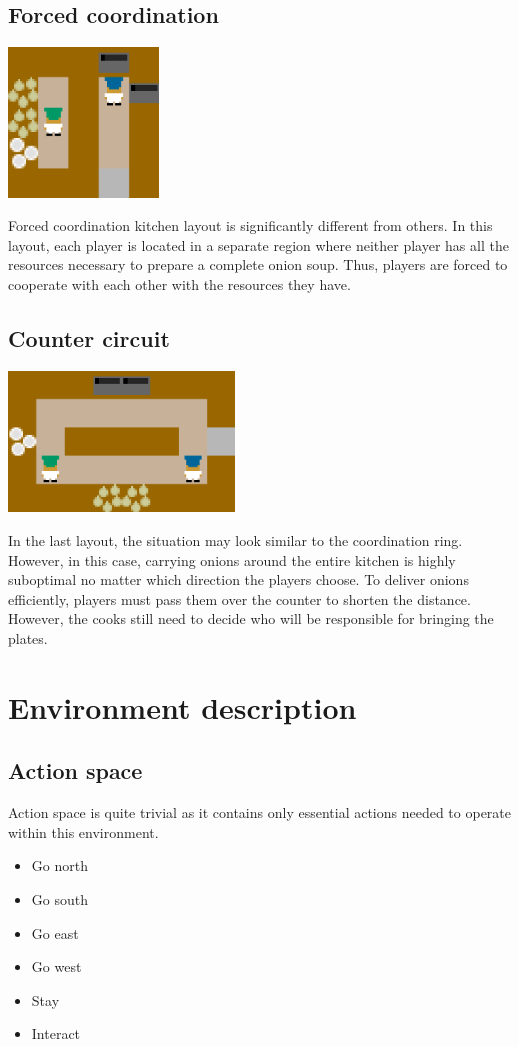 \subsection*{Forced coordination}
\begin{center}
    \includegraphics*[width=4cm]{../img/forced_coordination_layout.png}
\end{center}
Forced coordination kitchen layout is significantly different from others. 
In this layout, each player is located in a separate region where neither player has all the resources necessary to prepare a complete onion soup. 
Thus, players are forced to cooperate with each other with the resources they have.

\subsection*{Counter circuit}
\begin{center}
    \includegraphics*[width=6cm]{../img/counter_circuit_layout.png}
\end{center}
In the last layout, the situation may look similar to the coordination ring. However, in this case, carrying onions around the entire kitchen is highly suboptimal no matter which direction the players choose. 
To deliver onions efficiently, players must pass them over the counter to shorten the distance. 
However, the cooks still need to decide who will be responsible for bringing the plates. 


\section{Environment description}
\subsection{Action space}
Action space is quite trivial as it contains only essential actions needed to operate within this environment.
\begin{itemize}
    \item Go north
    \item Go south
    \item Go east
    \item Go west
    \item Stay
    \item Interact
\end{itemize}

